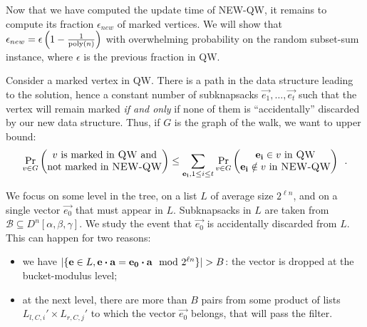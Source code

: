 Now that we have computed the update time of \textsc{NEW-QW}, it remains to compute its fraction $\epsilon_{new}$ of marked vertices. We will show that $\epsilon_{new}= \epsilon \left(1 - \frac{1}{\poly(n)} \right)$ with overwhelming probability on the random subset-sum instance, where $\epsilon$ is the previous fraction in \textsc{QW}.


Consider a marked vertex in \textsc{QW}. There is a path in the data structure leading to the solution, hence a constant number of subknapsacks $\vec{e_1}, \ldots, \vec{e_t}$ such that the vertex will remain marked \emph{if and only} if none of them is ``accidentally'' discarded by our new data structure. Thus, if $G$ is the graph of the walk, we want to upper bound:
$$ \Pr_{v \in G} \left( \begin{matrix}
\text{$v$ is marked in \textsc{QW} and} \\ \text{not marked in \textsc{NEW-QW}}
\end{matrix} \right) \leq \sum_{ \vec{e_i}, 1 \leq i \leq t} \Pr_{v \in G} \left(  \begin{matrix}
\vec{e_i} \in v \text{ in \textsc{QW}} \\
\vec{e_i} \notin v \text{ in \textsc{NEW-QW}} \\
\end{matrix} \right) \enspace. $$

We focus on some level in the tree, on a list $L$ of average size $2^{\ell n}$, and on a single vector $\vec{e_0}$ that must appear in $L$. Subknapsacks in $L$ are taken from $\mathcal{B}\subseteq D^n[\alpha,\beta, \gamma]$. We study the event that $\vec{e_0}$ is accidentally discarded from $L$. This can happen for two reasons:
\begin{itemize}
\item we have $|\{\vec{e} \in L,  \vec{e}\dotprod \vec{a} = \vec{e_0}\dotprod \vec{a} \mod{2^{\ell n}}\}| > B$: the vector is dropped at the bucket-modulus level;
\item at the next level, there are more than $B$ pairs from some product of lists $L_{l,C,i}' \times L_{r,C,j}'$ to which the vector $\vec{e_0}$ belongs, that will pass the filter.
\end{itemize}


